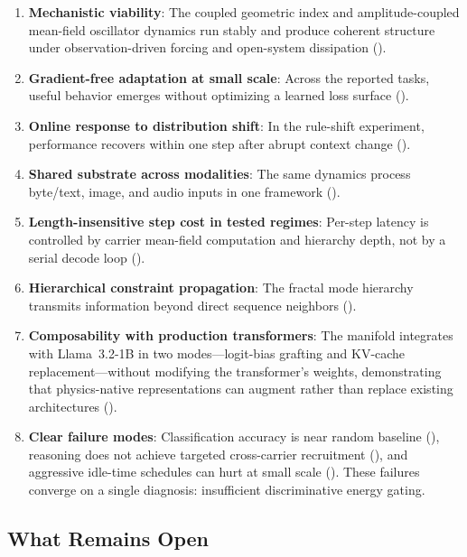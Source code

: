 \documentclass[11pt,a4paper]{article}
\begin{document}
\begin{enumerate}[nosep]
  \item \textbf{Mechanistic viability}: The coupled geometric index and amplitude-coupled mean-field oscillator dynamics run stably and produce coherent structure under observation-driven forcing and open-system dissipation ().
  \item \textbf{Gradient-free adaptation at small scale}: Across the reported tasks, useful behavior emerges without optimizing a learned loss surface ().
  \item \textbf{Online response to distribution shift}: In the rule-shift experiment, performance recovers within one step after abrupt context change ().
  \item \textbf{Shared substrate across modalities}: The same dynamics process byte/text, image, and audio inputs in one framework ().
  \item \textbf{Length-insensitive step cost in tested regimes}: Per-step latency is controlled by carrier mean-field computation and hierarchy depth, not by a serial decode loop ().
  \item \textbf{Hierarchical constraint propagation}: The fractal mode hierarchy transmits information beyond direct sequence neighbors ().
  \item \textbf{Composability with production transformers}: The manifold integrates with Llama~3.2-1B in two modes---logit-bias grafting and KV-cache replacement---without modifying the transformer's weights, demonstrating that physics-native representations can augment rather than replace existing architectures ().
  \item \textbf{Clear failure modes}: Classification accuracy is near random baseline (), reasoning does not achieve targeted cross-carrier recruitment (), and aggressive idle-time schedules can hurt at small scale (). These failures converge on a single diagnosis: insufficient discriminative energy gating.
\end{enumerate}

\subsection{What Remains Open}
\end{document}
